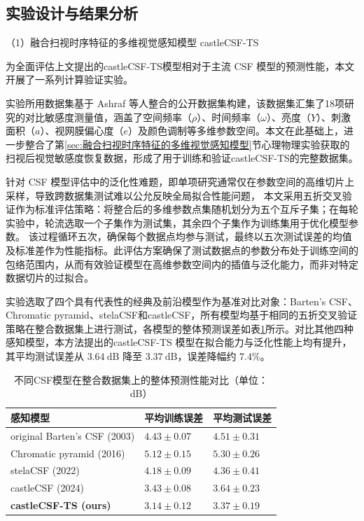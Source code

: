\label{sec:评价指标} 



\subsection{实验设计与结果分析}

（1）融合扫视时序特征的多维视觉感知模型 castleCSF-TS

为全面评估上文提出的castleCSF-TS模型相对于主流 CSF 模型的预测性能，本文开展了一系列计算验证实验。

实验所用数据集基于 Ashraf 等人整合的公开数据集构建\cite{1-2-9}，该数据集汇集了18项研究的对比敏感度测量值，涵盖了空间频率（$\rho$）、时间频率（$\omega$）、亮度（$Y$）、刺激面积（$a$）、视网膜偏心度（$e$）及颜色调制等多维参数空间。本文在此基础上，进一步整合了第\ref{sec:融合扫视时序特征的多维视觉感知模型}节心理物理实验获取的扫视后视觉敏感度恢复数据，形成了用于训练和验证castleCSF-TS的完整数据集。

针对 CSF 模型评估中的泛化性难题，即单项研究通常仅在参数空间的高维切片上采样，导致跨数据集测试难以公允反映全局拟合性能问题，
本文采用五折交叉验证作为标准评估策略：将整合后的多维参数点集随机划分为五个互斥子集；在每轮实验中，轮流选取一个子集作为测试集，其余四个子集作为训练集用于优化模型参数。
该过程循环五次，确保每个数据点均参与测试，最终以五次测试误差的均值及标准差作为性能指标。此评估方案确保了测试数据点的参数分布处于训练空间的包络范围内，从而有效验证模型在高维参数空间内的插值与泛化能力，而非对特定数据切片的过拟合。

实验选取了四个具有代表性的经典及前沿模型作为基准对比对象：Barten's CSF\cite{1-2-1-2}、Chromatic pyramid\cite{1-2-2-1}、stelaCSF\cite{1-2-8}和castleCSF\cite{1-2-9}，所有模型均基于相同的五折交叉验证策略在整合数据集上进行测试，各模型的整体预测误差如表\ref{tab:overall_performance}所示。对比其他四种感知模型，本方法提出的castleCSF-TS 模型在拟合能力与泛化性能上均有提升，其平均测试误差从 $3.64~\text{dB}$ 降至 $3.37~\text{dB}$，误差降幅约 $7.4\%$。


\begin{table}[htbp]
    \centering
    \caption{不同CSF模型在整合数据集上的整体预测性能对比（单位：dB）}
    \label{tab:overall_performance}
    \renewcommand{\arraystretch}{1.5}
    \begin{tabularx}{\textwidth}{
        >{\centering\arraybackslash}m{}
        >{\centering\arraybackslash}m{}
        >{\centering\arraybackslash}m{}}
        \toprule
        \textbf{感知模型} & \textbf{平均训练误差} & \textbf{平均测试误差} \\
        \midrule
        original Barten's CSF (2003) & $4.43 \pm 0.07$ & $4.51 \pm 0.31$ \\
        Chromatic pyramid (2016) & $5.12 \pm 0.15$ & $5.30 \pm 0.26$ \\
        stelaCSF (2022) & $4.18 \pm 0.09$ & $4.36 \pm 0.41$ \\
        castleCSF (2024) & $3.43 \pm 0.08$ & $3.64 \pm 0.23$ \\
        \textbf{castleCSF-TS (ours)} & $\mathbf{3.14 \pm 0.12}$ & $\mathbf{3.37 \pm 0.19}$ \\
        \bottomrule
    \end{tabularx}
\end{table}

